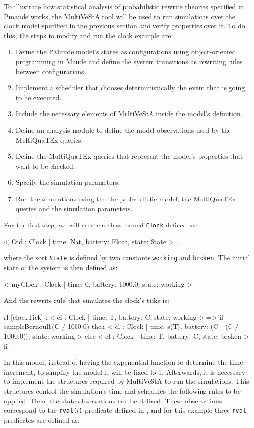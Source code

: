 To illustrate how statistical analysis of probabilistic rewrite theories specified in Pmaude works, the MultiVeStA tool will be used to run simulations over the clock model specified in the previous section and verify properties over it. To do this, the steps to modify and run the clock example are:
\begin{enumerate}
    \item Define the PMaude model's states as configurations using object-oriented programming in Maude and define the system transitions as rewriting rules between configurations.
    \item Implement a scheduler that chooses deterministically the event that is going to be executed.
    \item Include the necessary elements of MultiVeStA inside the model's definition.
    \item Define an analysis module to define the model observations used by the MultiQuaTEx queries.
    \item Define the MultiQuaTEx queries that represent the model's properties that want to be checked.
    \item Specify the simulation parameters.
    \item Run the simulations using the the probabilistic model, the MultiQuaTEx queries and the simulation parameters.
\end{enumerate} 
For the first step, we will create a class named \texttt{Clock} defined as:
\\
\begin{maude}
< Oid : Clock | time: Nat, battery: Float, state: State > .
\end{maude}
where the sort \texttt{State} is defined by two constants \texttt{working} and \texttt{broken}. The initial state of the system is then defined as:
\\
\begin{maude}
< myClock : Clock  | time: 0, battery: 1000.0, state: working >
\end{maude}
And the rewrite rule that simulates the clock's ticks is:
\\
\begin{maude}
rl [clockTick] :
    < cl : Clock  | time: T, battery: C, state: working > 
  =>
    if sampleBernoulli(C / 1000.0) then
      < cl : Clock  | time: s(T), battery: (C - (C / 1000.0)),
        state: working >
    else
      < cl : Clock  | time: T, battery: C, state: broken >
    fi .
\end{maude}
In this model, instead of having the exponential function to determine the time increment, to simplify the model it will be fixed to 1. Afterwards, it is necessary to implement the structures required by MultiVeStA to run the simulations. This structures control the simulation's time and schedules the following rules to be applied. Then, the state observations can be defined. These observations correspond to the \texttt{rval($i$)} predicate defined in \cite{Agha2006,multivesta}, and for this example three \texttt{rval} predicates are defined as:

